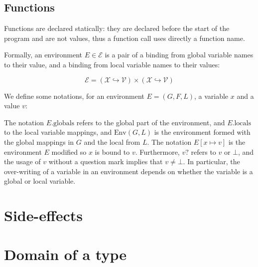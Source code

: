 \documentclass{book}
\newcommand\field[1]{.\text{#1}}
\newcommand\globals[0]{\field{globals}}
\newcommand\locals[0]{\field{locals}}
\newcommand\X[0]{\mathcal{X}}
\DeclareMathOperator{\dom}{dom}
\begin{document}
\subsection{Functions}
Functions are declared statically: they are declared before the start of the
program and are not values, thus a function call uses directly a function name. 

Formally, an environment $E \in \mathcal{E}$ is a pair of a binding from global
variable names to their value, and a binding from local variable names to their
values:

%
\[
  \mathcal{E} = \left( \X \hookrightarrow \mathcal{V} \right)
         \times \left( \X \hookrightarrow \mathcal{V} \right)
\]

We define some notations, for an environment $E = (G, F, L)$, a variable $x$
and a value $v$:
%
%
The notation $E\globals$ refers to the global part of the environment, and
$E\locals$ to the local variable mappings, and $\text{Env} (G, L)$ is the
environment formed with the global mappings in $G$ and the local from $L$.
%
The notation $E[x \mapsto v]$ is the environment $E$ modified so $x$ is bound
to $v$.
%
Furthermore, $v?$ refers to $v$ or $\bot$, and the usage of $v$ without a
question mark implies that $v \neq \bot$.
%
In particular, the over-writing of a variable in an environment depends on
whether the variable is a global or local variable.

\section{Side-effects}

\section{Domain of a type}
\end{document}
